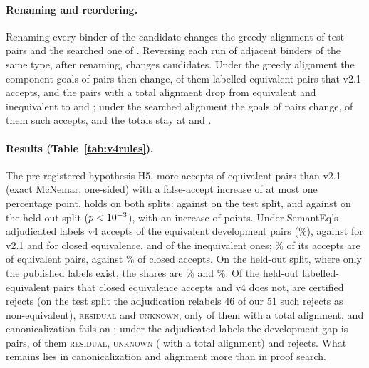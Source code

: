 \documentclass[10pt]{article}
\theoremstyle{definition}
\newcommand{\V}[1]{\textsc{#1}}
\begin{document}
\paragraph{Renaming and reordering.} Renaming every binder of the candidate changes the greedy
alignment of \VfRenameGreedy{} test pairs and the searched one of \VfRenameAlign{}. Reversing each
run of adjacent binders of the same type, after renaming, changes \VfShuffleCandidates{}
candidates. Under the greedy alignment the component goals of \VfShuffleGreedyGoals{} pairs then
change, \VfShuffleGreedyAcc{} of them labelled-equivalent pairs that v2.1 accepts, and the pairs
with a total alignment drop from \VfFullGreedyBeforeF{} equivalent and \VfFullGreedyBeforeU{}
inequivalent to \VfFullGreedyAfterF{} and \VfFullGreedyAfterU{}; under the searched alignment the
goals of \VfShuffleAlignGoals{} pairs change, \VfShuffleAlignAcc{} of them such accepts, and the
totals stay at \VfFullAlignAfterF{} and \VfFullAlignAfterU{}.

\paragraph{Results (Table~\ref{tab:v4rules}).} The pre-registered hypothesis H5, more accepts of
equivalent pairs than v2.1 (exact McNemar, one-sided) with a false-accept increase of at most one
percentage point, holds on both splits: \VfTestHfiveB{} against \VfTestHfiveC{} on the test split,
and \VfValidHfiveB{} against \VfValidHfiveC{} on the held-out split ($p<10^{-3}$), with an
increase of \VfValidHfiveFAIncrease{} points. Under SemantEq's adjudicated labels v4 accepts
\VfTestAdjVfourAcc{} of the \VfTestAdjF{} equivalent development pairs (\VfTestAdjVfourAccPct\%),
against \VfTestAdjVtwoOneAcc{} for v2.1 and \VfTestAdjClosedAcc{} for closed equivalence, and
\VfTestAdjVfourFA{} of the \VfTestAdjU{} inequivalent ones; \VfTestAdjVfourPrec\% of its accepts are
of equivalent pairs, against \VfTestAdjClosedPrec\% of closed accepts. On the held-out split, where
only the published labels exist, the shares are \VfValidPubVfourPrec\% and \VfValidPubClosedPrec\%.
Of the \VfValidPubGap{} held-out labelled-equivalent pairs that closed equivalence accepts and v4
does not, \VfValidPubGapReject{} are certified rejects (on the test split the adjudication relabels
46 of our 51 such rejects as non-equivalent), \VfValidPubGapResidual{} \V{residual} and
\VfValidPubGapUnknown{} \V{unknown}, only \VfValidPubGapUnknownTotal{} of them with a total
alignment, and canonicalization fails on \VfValidPubGapCanonFail{}; under the adjudicated labels
the development gap is \VfTestAdjGap{} pairs, \VfTestAdjGapResidual{} of them \V{residual},
\VfTestAdjGapUnknown{} \V{unknown} (\VfTestAdjGapUnknownTotal{} with a total alignment) and
\VfTestAdjGapReject{} rejects. What remains lies in canonicalization and alignment more than in
proof search.
\end{document}
